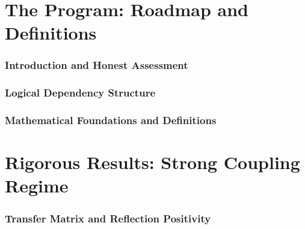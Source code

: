 \documentclass[11pt,a4paper]{article}
\begin{document}
\maketitle

\begin{abstract}

\end{abstract}

\tableofcontents
\newpage


\part{The Program: Roadmap and Definitions}

\section{Introduction and Honest Assessment}


\section{Logical Dependency Structure}


\section{Mathematical Foundations and Definitions}




\part{Rigorous Results: Strong Coupling Regime}
\label{part:strong-coupling}

\section{Transfer Matrix and Reflection Positivity}

\end{document}
